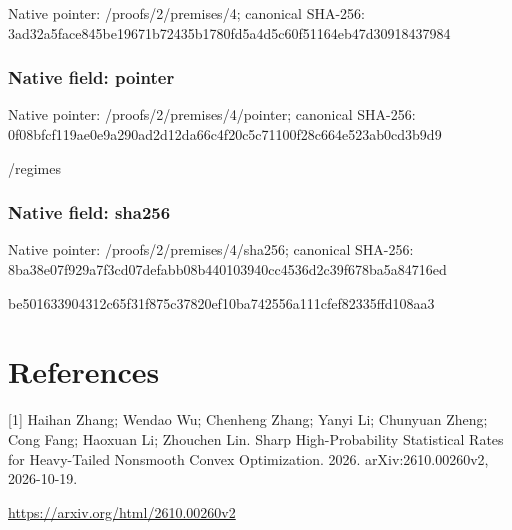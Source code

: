 \documentclass[10pt,a4paper]{article}
\begin{document}
Native pointer: /proofs/2/premises/4; canonical SHA-256: 3ad32a5face845be19671b72\allowbreak{}435b1780fd5a4d5c60f51164\allowbreak{}eb47d30918437984



\subsubsection{Native field: pointer}


Native pointer: /proofs/2/premises/4/pointer; canonical SHA-256: 0f08bfcf119ae0e9a290ad2d\allowbreak{}12da66c4f20c5c71100f28c6\allowbreak{}64e523ab0cd3b9d9


/regimes


\subsubsection{Native field: sha256}


Native pointer: /proofs/2/premises/4/sha256; canonical SHA-256: 8ba38e07f929a7f3cd07defa\allowbreak{}bb08b440103940cc4536d2c3\allowbreak{}9f678ba5a84716ed


be501633904312c65f31f875\allowbreak{}c37820ef10ba742556a111cf\allowbreak{}ef82335ffd108aa3


\section{References}


[1] Haihan Zhang; Wendao Wu; Chenheng Zhang; Yanyi Li; Chunyuan Zheng; Cong Fang; Haoxuan Li; Zhouchen Lin. Sharp High-Probability Statistical Rates for Heavy-Tailed Nonsmooth Convex Optimization. 2026. arXiv:2610.00260v2, 2026-10-19.



\url{https://arxiv.org/html/2610.00260v2}
\end{document}
